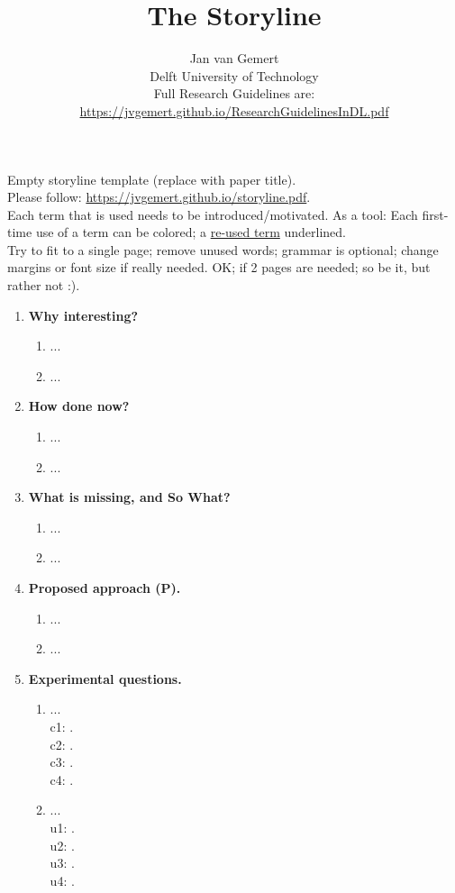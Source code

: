 \documentclass[a4paper,12pt]{article}
\title{The Storyline }
\author{Jan van Gemert \\ Delft University of Technology \\
	Full Research Guidelines are: \\ \url{https://jvgemert.github.io/ResearchGuidelinesInDL.pdf} }
\date{}
\begin{document}
\clearpage

Empty storyline template (replace with paper title).  \\
Please follow: \url{https://jvgemert.github.io/storyline.pdf}. \\
Each term that is used needs to be introduced/motivated. As a tool: Each \colorbox{cyan!20}{first-time} use of a term can be colored; a \underline{re-used term} underlined. \\
Try to fit to a single page; remove unused words; grammar is optional; change margins or font size if really needed. {\scriptsize OK; if 2 pages are needed; so be it, but rather not :).} \\



\begin{enumerate}[left=0pt,nosep]
	\item \textbf{Why interesting?}
	\begin{enumerate}[left=-10pt,label=\alph*,nosep]
		\item ...
		\item ...
	\end{enumerate}
	\item \textbf{How done now?}
	\begin{enumerate}[left=-10pt,label=\alph*,nosep]
		\item ...
		\item ...
	\end{enumerate}
	\item \textbf{What is missing, and So What?}
	\begin{enumerate}[left=-10pt,label=\alph*,nosep]
		\item ...
		\item ...
	\end{enumerate}
	\item \textbf{Proposed approach (P). }
	\begin{enumerate}[left=-10pt,label=\alph*,nosep]
		\item ...
		\item ...
	\end{enumerate}
	\item \textbf{Experimental questions.}
	\begin{enumerate}[left=-10pt,label=\alph*,nosep]
        \item ... \\
        c1: .\\
        c2: .\\
        c3: .\\
        c4: .
        \item ... \\
        u1: .\\
        u2: .\\
        u3: .\\
        u4: .
	\end{enumerate}
\end{enumerate}
\end{document}
